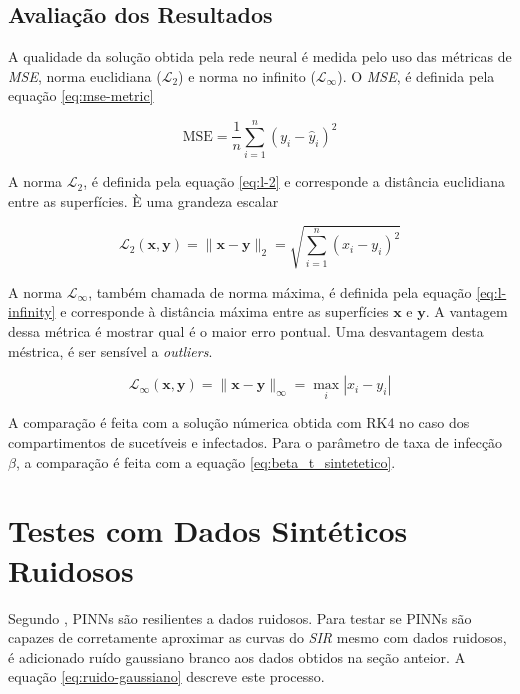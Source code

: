 \subsection{Avaliação dos Resultados}

A qualidade da solução obtida pela rede neural é medida pelo uso das métricas
de \textit{MSE}, norma euclidiana ($\mathcal{L}_2$) e norma no infinito 
($\mathcal{L}_{\infty}$). 
O \textit{MSE}, é definida pela equação \ref{eq:mse-metric}  

\begin{equation}\label{eq:mse-metric}
    \text{MSE} = \frac{1}{n} \sum_{i=1}^{n} (y_i - \hat{y}_i)^2
\end{equation}

A norma $\mathcal{L}_2$, é definida pela equação \ref{eq:l-2} e corresponde
a distância euclidiana entre as superfícies. È uma grandeza escalar  

\begin{equation}\label{eq:l-2}
    \mathcal{L}_2(\mathbf{x}, \mathbf{y}) = \|\mathbf{x} - \mathbf{y}\|_2 = \sqrt{\sum_{i=1}^{n} (x_i - y_i)^2}
\end{equation}

A norma $\mathcal{L}_{\infty}$, também chamada de norma máxima, é definida 
pela equação \ref{eq:l-infinity} e corresponde à distância máxima entre as
superfícies $\mathbf{x}$ e $\mathbf{y}$. A vantagem dessa métrica é mostrar
qual é o maior erro pontual. Uma desvantagem desta méstrica, é ser sensível 
a \textit{outliers}.

\begin{equation}\label{eq:l-infinity}
    \mathcal{L}_\infty(\mathbf{x}, \mathbf{y}) = \|\mathbf{x} - \mathbf{y}\|_\infty = \max_{i} |x_i - y_i|
\end{equation}

A comparação é feita com a solução númerica obtida com RK4 no caso dos 
compartimentos de sucetíveis e infectados. Para o parâmetro de taxa de infecção
$\beta$, a comparação é feita com a equação \ref{eq:beta_t_sintetetico}.

\section{Testes com Dados Sintéticos Ruidosos}

Segundo \cite{raissi-etal:19}, PINNs são resilientes a dados ruidosos. Para
testar se PINNs são capazes de corretamente aproximar as curvas do \textit{SIR}
mesmo com dados ruidosos,
é adicionado ruído gaussiano branco aos dados obtidos na seção anteior.
A equação \ref{eq:ruido-gaussiano} descreve este processo.

